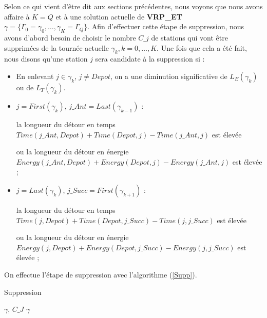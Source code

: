 {	Selon ce qui vient d'être dit aux sections précédentes, nous voyons que nous avons affaire à $K =Q$ et à une solution actuelle de \textbf{VRP\_ET} $\gamma=\{\Gamma_0=\gamma_0, \dots, \gamma_K=\Gamma_Q\}$. Afin d'effectuer cette étape de suppression, nous avons d'abord besoin de choisir le nombre $C\_j$ de stations qui vont être supprimées de la tournée actuelle $\gamma_k, k=0, \dots, K$. Une fois que cela a été fait, nous disons qu'une station $j$ sera candidate à la suppression si :
	\begin{itemize}[label=$\square$]
		\item En enlevant $j\in \gamma_k$, $j\neq Depot$,  on a une diminution significative de $L_E(\gamma_k)$ ou de $L_T(\gamma_k)$.
		\item $j = First(\gamma_k)$, $j\_Ant = Last(\gamma_{k-1})$ :
		
		la longueur du détour en temps
		$Time(j\_Ant, Depot) + Time(Depot, j) - Time(j\_Ant, j)$
		est élevée
		
		ou la longueur du détour en énergie 
		$Energy(j\_Ant, Depot) + Energy(Depot, j) - Energy(j\_Ant, j)$ est élevée ;
		\item $j = Last(\gamma_k)$, $j\_Succ = First(\gamma_{k+1})$ :
		
		la longueur du détour en temps $Time(j, Depot) + Time(Depot, j\_Succ) - Time(j, j\_Succ)$ est élevée
		
		ou la longueur du détour en énergie $Energy(j, Depot) + Energy(Depot, j\_Succ) - Energy(j, j\_Succ) $ est élevée ; 
	\end{itemize}
	
	On effectue l'étape de suppression avec l'algorithme (\ref{Supp}).
	\begin{algorithm}
		\caption{Suppression}
		\label{Supp}
		\begin{algorithmic}[1]
			\REQUIRE $\gamma$, $C\_J$
			\ENSURE $\gamma$
			\hline
			\vspace{0.5cm}
			

\end{algorithmic}
\end{algorithm}}
